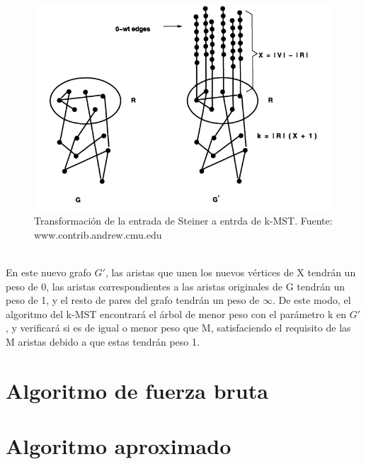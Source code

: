 \documentclass[spanish,12pt]{elsarticle}
\begin{document}
\begin{figure}[h]
    \centering
    \includegraphics[scale=0.65]{images/graph_explicacion.png}
    \caption{Transformación de la entrada de Steiner a entrda de k-MST. Fuente: www.contrib.andrew.cmu.edu }
    \label{fig:my_label}
\end{figure}
\\
En este nuevo grafo $G'$, las aristas que unen los nuevos vértices de X tendrán un peso de 0, las aristas correspondientes a las aristas originales de G tendrán un peso de 1, y el resto de pares del grafo tendrán un peso de $\infty$. De este modo, el algoritmo del k-MST encontrará el árbol de menor peso con el parámetro k en $G'$, y verificará si es de igual o menor peso que M, satisfaciendo el requisito de las M aristas debido a que estas tendrán peso 1.\\


 
\section{Algoritmo de fuerza bruta}



\section{Algoritmo aproximado}



\end{document}
